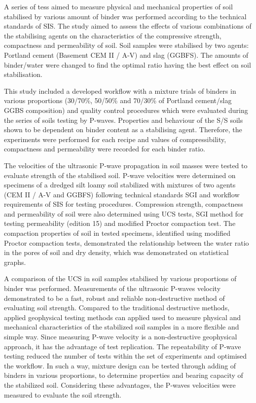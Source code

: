 \documentclass{amestyle}
\begin{document}
A series of tess aimed to measure physical and mechanical properties of soil stabilised by various amount of binder was performed according to the technical standards of SIS. The study aimed to assess the effects of various combinations of the stabilising agents on the characteristics of the compressive strength, compactness and permeability of soil. Soil samples were stabilised by two agents: Portland cement (Basement CEM II / A-V) and slag (GGBFS). The amounts of binder/water were changed to find the optimal ratio having the best effect on soil stabilisation. 

This study included a developed workflow with a mixture trials of binders in various proportions (30/70\%, 50/50\% and 70/30\% of Portland cement/slag GGBS composition) and quality control procedures which were evaluated during the series of soils testing by P-waves. Properties and behaviour of the S/S soils shown to be dependent on binder content as a stabilising agent. Therefore, the experiments were performed for each recipe and values of compressibility, compactness and permeability were recorded for each binder ratio. 

The velocities of the ultrasonic P-wave propagation in soil masses were tested to evaluate strength of the stabilised soil. P-wave velocities were determined on specimens of a dredged silt loamy soil stabilized with mixtures of two agents (CEM II / A-V and GGBFS) following technical standards SGI and workflow requirements of SIS for testing procedures. Compression strength, compactness and permeability of soil were also determined using UCS tests, SGI method for testing permeability (edition 15) and modified Proctor compaction test. The compaction properties of soil in tested specimens, identified using modified Proctor compaction tests, demonstrated the relationship between the water ratio in the pores of soil and dry density, which was demonstrated on statistical graphs.

A comparison of the UCS in soil samples stabilised by various proportions of binder was performed. Measurements of the ultrasonic P-waves velocity demonstrated to be a fast, robust and reliable non-destructive method of evaluating soil strength. Compared to the traditional destructive methods, applied geophysical testing methods can applied used to measure physical and mechanical characteristics of the stabilized soil samples in a more flexible and simple way. Since measuring P-wave velocity is a non-destructive geophysical approach, it has the advantage of test replication. The repeatability of P-wave testing reduced the number of tests within the set of experiments and optimised the workflow. In such a way, mixture design can be tested through adding of binders in various proportions, to determine properties and bearing capacity of the stabilized soil. Considering these advantages, the P-waves velocities were measured to evaluate the soil strength. 
\end{document}
